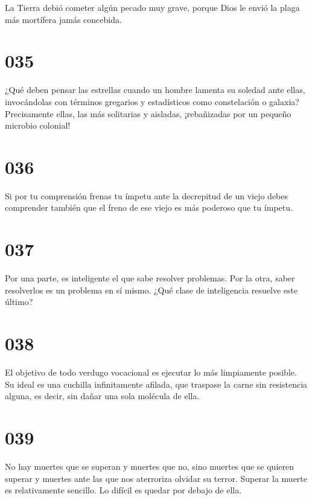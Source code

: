 \documentclass[a4paper,11pt,openright,twocolumn]{book}
\begin{document}
La Tierra debió cometer algún pecado muy grave, porque Dios le envió la plaga más mortífera jamás concebida.

\section*{035}

¿Qué deben pensar las estrellas cuando un hombre lamenta su soledad ante ellas, invocándolas con términos gregarios y estadísticos como constelación o galaxia? Precisamente ellas, las más solitarias y aisladas, ¡rebañizadas por un pequeño microbio colonial!

\section*{036}

Si por tu comprensión frenas tu ímpetu ante la decrepitud de un viejo debes comprender también que el freno de ese viejo es más poderoso que tu ímpetu. 

\section*{037}

Por una parte, es inteligente el que sabe resolver problemas. Por la otra, saber resolverlos es un problema en sí mismo. ¿Qué clase de inteligencia resuelve este último?

\section*{038}

El objetivo de todo verdugo vocacional es ejecutar lo más limpiamente posible. Su ideal es una cuchilla infinitamente afilada, que traspase la carne sin resistencia alguna, es decir, sin dañar una sola molécula de ella.

\section*{039}

No hay muertes que se superan y muertes que no, sino muertes que se quieren superar y muertes ante las que nos aterroriza olvidar su terror. Superar la muerte es relativamente sencillo. Lo difícil es quedar por debajo de ella.
\end{document}
